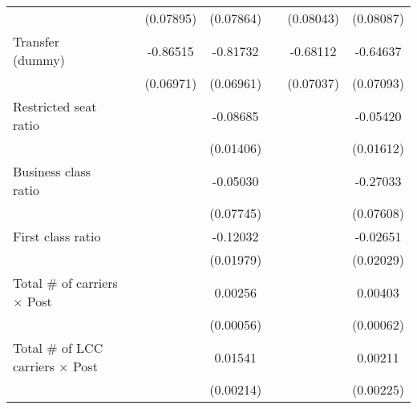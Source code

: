 \begin{table}[htbp]
\begin{tabular}{l*{6}{c}}
                    &                     &   (0.07895)         &   (0.07864)         &                     &   (0.08043)         &   (0.08087)         \\
\addlinespace
\shortstack{Transfer \\ (dummy)}&                     &    -0.86515\sym{***}&    -0.81732\sym{***}&                     &    -0.68112\sym{***}&    -0.64637\sym{***}\\
                    &                     &   (0.06971)         &   (0.06961)         &                     &   (0.07037)         &   (0.07093)         \\
\addlinespace
Restricted seat ratio&                     &                     &    -0.08685\sym{***}&                     &                     &    -0.05420\sym{***}\\
                    &                     &                     &   (0.01406)         &                     &                     &   (0.01612)         \\
\addlinespace
Business class ratio&                     &                     &    -0.05030         &                     &                     &    -0.27033\sym{***}\\
                    &                     &                     &   (0.07745)         &                     &                     &   (0.07608)         \\
\addlinespace
First class ratio   &                     &                     &    -0.12032\sym{***}&                     &                     &    -0.02651         \\
                    &                     &                     &   (0.01979)         &                     &                     &   (0.02029)         \\
\addlinespace
Total # of carriers $\times$ Post&                     &                     &     0.00256\sym{***}&                     &                     &     0.00403\sym{***}\\
                    &                     &                     &   (0.00056)         &                     &                     &   (0.00062)         \\
\addlinespace
Total # of LCC carriers $\times$ Post&                     &                     &     0.01541\sym{***}&                     &                     &     0.00211         \\
                    &                     &                     &   (0.00214)         &                     &                     &   (0.00225)         \\

\end{tabular}
\end{table}
